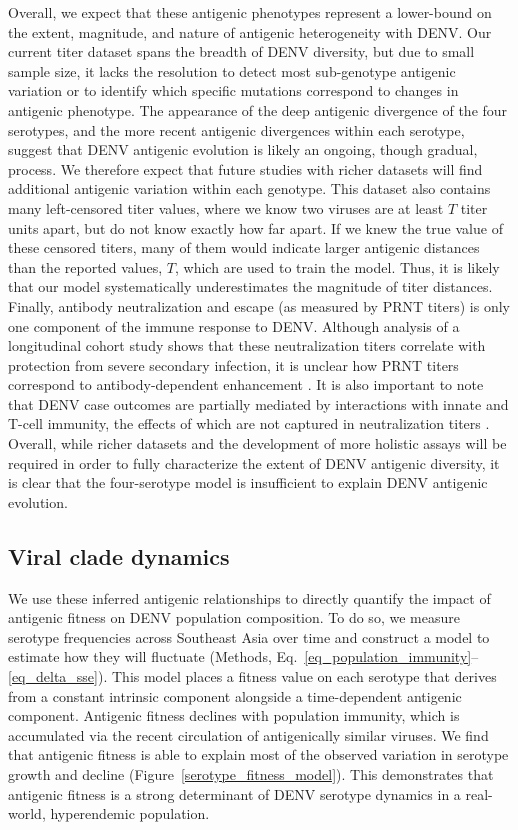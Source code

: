 \documentclass[11pt,oneside,letterpaper]{article}
\begin{document}
Overall, we expect that these antigenic phenotypes represent a lower-bound on the extent, magnitude, and nature of antigenic heterogeneity with DENV.
Our current titer dataset spans the breadth of DENV diversity, but due to small sample size, it lacks the resolution to detect most sub-genotype antigenic variation or to identify which specific mutations correspond to changes in antigenic phenotype.
The appearance of the deep antigenic divergence of the four serotypes, and the more recent antigenic divergences within each serotype, suggest that DENV antigenic evolution is likely an ongoing, though gradual, process.
We therefore expect that future studies with richer datasets will find additional antigenic variation within each genotype.
This dataset also contains many left-censored titer values, where we know two viruses are at least $T$ titer units apart, but do not know exactly how far apart.
If we knew the true value of these censored titers, many of them would indicate larger antigenic distances than the reported values, $T$, which are used to train the model.
Thus, it is likely that our model systematically underestimates the magnitude of titer distances.
Finally, antibody neutralization and escape (as measured by PRNT titers) is only one component of the immune response to DENV.
Although analysis of a longitudinal cohort study shows that these neutralization titers correlate with protection from severe secondary infection, it is unclear how PRNT titers correspond to antibody-dependent enhancement \citep{katzelnick2016neutralizing}.
It is also important to note that DENV case outcomes are partially mediated by interactions with innate and T-cell immunity, the effects of which are not captured in neutralization titers \citep{green2014innate}.
Overall, while richer datasets and the development of more holistic assays will be required in order to fully characterize the extent of DENV antigenic diversity, it is clear that the four-serotype model is insufficient to explain DENV antigenic evolution.

\subsection*{Viral clade dynamics}
We use these inferred antigenic relationships to directly quantify the impact of antigenic fitness on DENV population composition.
To do so, we measure serotype frequencies across Southeast Asia over time and construct a model to estimate how they will fluctuate (Methods, Eq.~\ref{eq_population_immunity}--\ref{eq_delta_sse}).
This model places a fitness value on each serotype that derives from a constant intrinsic component alongside a time-dependent antigenic component.
Antigenic fitness declines with population immunity, which is accumulated via the recent circulation of antigenically similar viruses.
We find that antigenic fitness is able to explain most of the observed variation in serotype growth and decline (Figure~\ref{serotype_fitness_model}).
This demonstrates that antigenic fitness is a strong determinant of DENV serotype dynamics in a real-world, hyperendemic population.
\end{document}
